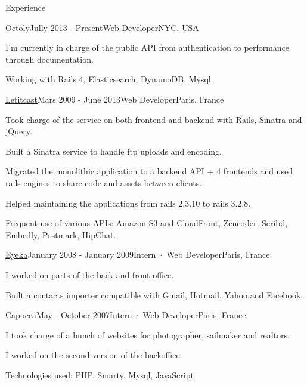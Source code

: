 \documentclass{resume} %
\begin{document}

\begin{rSection}{Experience}

\begin{rSubsection}{\href{http://octoly.com}{Octoly}}{Jully 2013 - Present}{Web Developer}{NYC, USA}
\item I'm currently in charge of the public API from authentication to performance through documentation.
\item Working with Rails 4, Elasticsearch, DynamoDB, Mysql.
\end{rSubsection}


\begin{rSubsection}{\href{http://letitcast.com}{Letitcast}}{Mars 2009 - June 2013}{Web Developer}{Paris, France}
\item Took charge of the service on both frontend and backend with Rails, Sinatra and jQuery.
\item Built a Sinatra service to handle ftp uploads and encoding.
\item Migrated the monolithic application to a backend API + 4 frontends and used rails engines to share code and assets between clients.
\item Helped maintaining the applications from rails 2.3.10 to rails 3.2.8.
\item Frequent use of various APIs: Amazon S3 and CloudFront, Zencoder, Scribd, Embedly, Postmark, HipChat.
\end{rSubsection}


\begin{rSubsection}{\href{http://eyeka.com}{Eyeka}}{January 2008 - January 2009}{Intern~$\cdot$~Web Developer}{Paris, France}
\item I worked on parts of the back and front office.
\item Built a contacts importer compatible with Gmail, Hotmail, Yahoo and Facebook.
\end{rSubsection}

\begin{rSubsection}{\href{http://capocea.com}{Capocea}}{May - October 2007}{Intern~$\cdot$~Web Developer}{Paris, France}
\item I took charge of a bunch of websites for photographer, sailmaker and realtors.
\item I worked on the second version of the backoffice.
\item Technologies used: PHP, Smarty, Mysql, JavaScript
\end{rSubsection}


\end{rSection}
\end{document}
